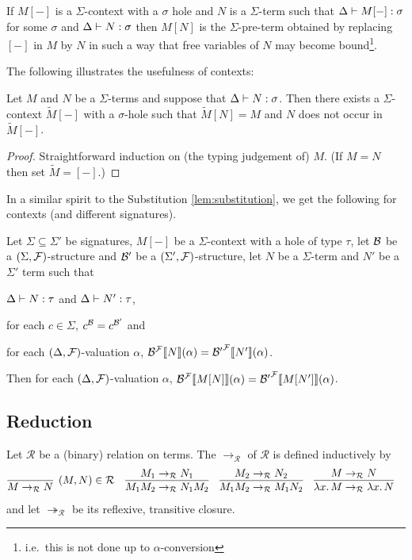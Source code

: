 \documentclass[a4paper,twoside,notitlepage,openright,11pt]{report}
\begin{document}
If $M[-]$ is a $\Sigma$-context with a $\sigma$ hole and $N$ is a $\Sigma$-term such that
$\Delta\vdash M[-]:\sigma$ for some $\sigma$ and $\Delta\vdash N:\sigma$ then $M[N]$ is the $\Sigma$-pre-term obtained by replacing $[-]$ in $M$ by $N$ in such a way that free variables of $N$ may become bound\footnote{i.e.\ this is not done up to $\alpha$-conversion}.

The following illustrates the usefulness of contexts:
\begin{lemma}
  \label{lem:contextex}
  Let $M$ and $N$ be a $\Sigma$-terms and suppose that $\Delta\vdash N:\sigma$. Then there exists a $\Sigma$-context $\widetilde M[-]$ with a $\sigma$-hole such that $\widetilde M[N]=M$ and $N$ does not occur  in $\widetilde M[-]$.
\end{lemma}
\begin{proof}
  Straightforward induction on (the typing judgement of) $M$. (If $M=N$ then set $\widetilde M=[-]$.)
\end{proof}

In a similar spirit to the Substitution \cref{lem:substitution}, we get the following for contexts (and different signatures).
\begin{lemma}[Context]
  \label{lem:contextequal}
  Let $\Sigma\subseteq\Sigma'$ be signatures, $M[-]$ be a $\Sigma$-context with a hole of type $\tau$, let $\mathcal B$ be a $(\Sigma,\mathcal F)$-structure and $\mathcal B'$ be a $(\Sigma',\mathcal F)$-structure, let $N$ be a $\Sigma$-term and $N'$ be a $\Sigma'$ term such that
  \begin{thmlist}
  \item $\Delta\vdash N:\tau$ and $\Delta\vdash N':\tau$,
  \item for each $c\in\Sigma$, $c^\mathcal B=c^{\mathcal B'}$ and
  \item for each $(\Delta,\mathcal F)$-valuation $\alpha$, ${\mathcal B}^\mathcal F\llbracket N\rrbracket(\alpha)={\mathcal B'}^\mathcal F\llbracket N'\rrbracket(\alpha)$.
  \end{thmlist}
  Then for each $(\Delta,\mathcal F)$-valuation $\alpha$, ${\mathcal B}^\mathcal F\llbracket M[N]\rrbracket(\alpha)={\mathcal B'}^\mathcal F\llbracket M[N']\rrbracket(\alpha)$.
\end{lemma}


\subsection{Reduction}
Let $\mathcal R$ be a (binary) relation on terms. The  $\rightarrow_{\mathcal R}$ of $\mathcal R$ is defined inductively by
\begin{align*}
  &\infer[(M,N)\in\mathcal R]{M\rightarrow_{\mathcal R}N}{}&&\infer{M_1M_2\rightarrow_{\mathcal R}N_1M_2}{M_1\rightarrow_{\mathcal R}N_1}&&\infer{M_1M_2\rightarrow_{\mathcal R}M_1N_2}{M_2\rightarrow_{\mathcal R}N_2}&&\infer{\lambda x\ldotp M\rightarrow_{\mathcal R}\lambda x\ldotp N}{M\rightarrow_{\mathcal R}N}
\end{align*}
and let $\twoheadrightarrow_{\mathcal R}$ be its reflexive, transitive closure.
\end{document}
